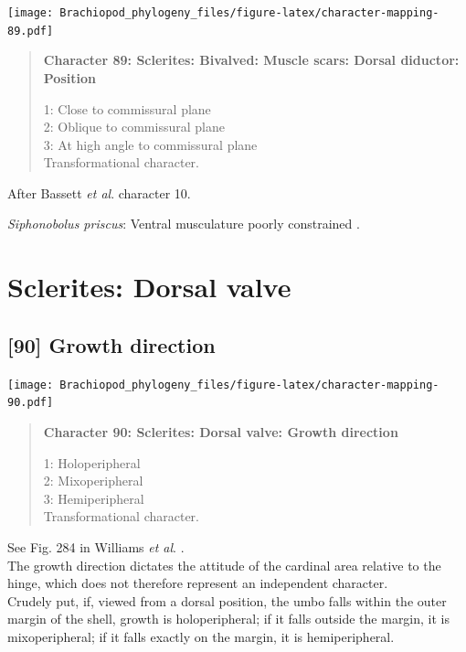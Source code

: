 \documentclass[openany]{book}
\begin{document}
\texttt{[image: Brachiopod\_phylogeny\_files/figure-latex/character-mapping-89.pdf]}

\begin{quote}
\textbf{Character 89: Sclerites: Bivalved: Muscle scars: Dorsal
diductor: Position}

1: Close to commissural plane\\
2: Oblique to commissural plane\\
3: At high angle to commissural plane\\
Transformational character.
\end{quote}

After Bassett \emph{et al}.
\citeyearpar{Bassett2001Functionalmorphology} character 10.

\hypertarget{Siphonobolus_priscus-coding-89}{}
\emph{Siphonobolus priscus}: Ventral musculature poorly constrained
\citep{Williams2000LinguliformeaCraniiformea, Popov2009Earlyontogeny}.

\section{Sclerites: Dorsal valve}\label{sclerites-dorsal-valve}

\subsection*{{[}90{]} Growth direction}\label{growth-direction}

\texttt{[image: Brachiopod\_phylogeny\_files/figure-latex/character-mapping-90.pdf]}

\begin{quote}
\textbf{Character 90: Sclerites: Dorsal valve: Growth direction}

1: Holoperipheral\\
2: Mixoperipheral\\
3: Hemiperipheral\\
Transformational character.
\end{quote}

See Fig. 284 in Williams \emph{et al}.
\citeyearpar{Williams1997Introduction}.\\
The growth direction dictates the attitude of the cardinal area relative
to the hinge, which does not therefore represent an independent
character.\\
Crudely put, if, viewed from a dorsal position, the umbo falls within
the outer margin of the shell, growth is holoperipheral; if it falls
outside the margin, it is mixoperipheral; if it falls exactly on the
margin, it is hemiperipheral.
\end{document}
